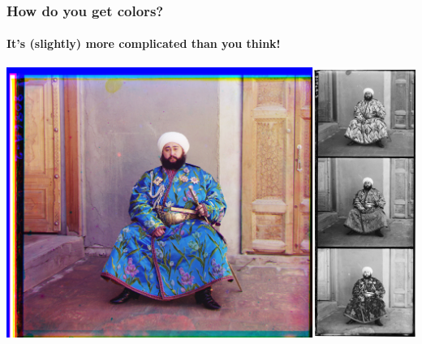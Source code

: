 \documentclass[]{beamer}
\begin{document}
\begin{frame}
    \frametitle{How do you get colors?}
    \framesubtitle{It's (slightly) more complicated than you think!}
    \begin{center}
        \includegraphics[width=0.80\paperwidth]{images/rgb-compose.jpg}
    \end{center}
\end{frame}
{
\begin{frame}[plain]
\end{frame}}
\end{document}
